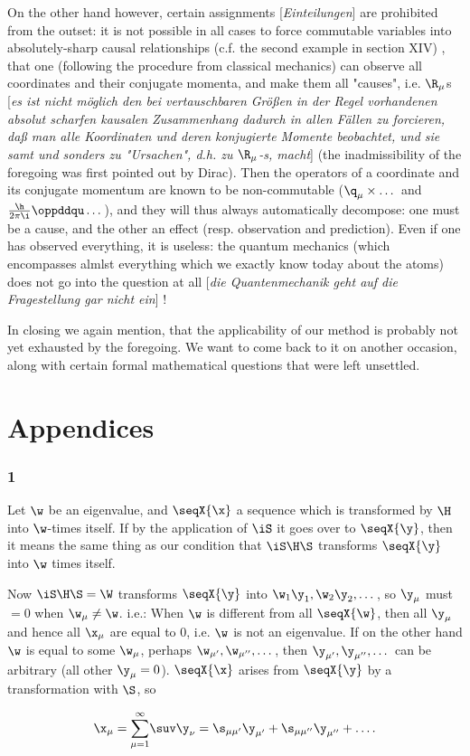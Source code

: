\documentclass{article}
\newcommand{\WTF}[1]{
[\it{\small{#1}}]
}
\newcommand{\uequ}[1]{
\begin{align*}
#1
\end{align*}
}
\renewcommand{\it}[1]{\textit{#1}}
\newcommand{\sumXY}[2]{\underset{#1}{\overset{#2}{\sum}}}
\begin{document}
On the other hand however, certain assignments\WTF{Einteilungen} are prohibited from the outset: it is not possible in all cases to force commutable variables into absolutely-sharp causal relationships (c.f. the second example in section XIV) , that one (following the procedure from classical mechanics) can observe all coordinates and their conjugate momenta, and make them all "causes", i.e. $\R_\mu$s\WTF{es ist nicht möglich den bei vertauschbaren Größen in der Regel vorhandenen absolut  scharfen kausalen Zusammenhang dadurch in allen Fällen zu forcieren, daß man alle Koordinaten und deren konjugierte Momente beobachtet, und sie samt und sonders zu "Ursachen", d.h. zu $\R_\mu$-s, macht} (the inadmissibility of the foregoing was first pointed out by Dirac). Then the operators of a coordinate and its conjugate momentum are known to be non-commutable ($\q_\mu\times\dots$ and $\frac{\h}{2\pi\i}\oppddqu\dots$), and they will thus always automatically decompose: one must be a cause, and the other an effect (resp. observation and prediction). Even if one has observed everything, it is useless: the quantum mechanics (which encompasses almlst everything which we exactly know today about the atoms) does not go into the question at all\WTF{die Quantenmechanik geht auf die Fragestellung gar nicht ein}!

In closing we again mention, that the applicability of our method is probably not yet exhausted by the foregoing. We want to come back to it on another occasion, along with certain formal mathematical questions that were left unsettled.

\part*{Appendices}

\section*{1}

Let $\w$ be an eigenvalue, and $\seqX{\x}$ a sequence which is transformed by $\H$ into $\w$-times itself. If by the application of $\iS$ it goes over to $\seqX{\y}$, then it means the same thing as our condition that $\iS\H\S$ transforms $\seqX{\y}$ into $\w$ times itself.

Now $\iS\H\S=\W$ transforms $\seqX{\y}$ into $\w_1\y_1,\w_2\y_2,\dots$, so $\y_\mu$ must $=0$ when $\w_\mu \neq \w$. i.e.: When $\w$ is different from all $\seqX{\w}$, then all $\y_\mu$ and hence all $\x_\mu$ are equal to $0$, i.e. $\w$ is not an eigenvalue. If on the other hand $\w$ is equal to some $\w_\mu$, perhaps $\w_{\mu'},\w_{\mu''},\dots$, then $\y_{\mu'},\y_{\mu''},\dots$ can be arbitrary (all other $\y_\mu=0$). $\seqX{\x}$ arises from $\seqX{\y}$ by a transformation with $\S$, so
\uequ{
\x_\mu=\sumXY{\mu=1}{\infty}\suv\y_\nu =
\s_{\mu\mu'}\y_{\mu'} + \s_{\mu\mu''}\y_{\mu''} + \dots.}
\end{document}
